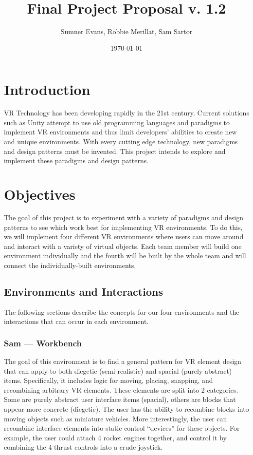 \documentclass[titlepage,12pt]{article}
\title{Final Project Proposal v. 1.2}
\author{Sumner Evans, Robbie Merillat, Sam Sartor}
\date{\today}
\begin{document}
\maketitle

\section{Introduction}

VR Technology has been developing rapidly in the 21st century. Current solutions
such as Unity attempt to use old programming languages and paradigms to
implement VR environments and thus limit developers' abilities to create new and
unique environments. With every cutting edge technology, new paradigms and
design patterns must be invented. This project intends to explore and implement
these paradigms and design patterns.

\section{Objectives}

The goal of this project is to experiment with a variety of paradigms and design
patterns to see which work best for implementing VR environments. To do this, we
will implement four different VR environments where users can move around and
interact with a variety of virtual objects. Each team member will build one
environment individually and the fourth will be built by the whole team and will
connect the individually-built environments.

\subsection{Environments and Interactions}
The following sections describe the concepts for our four environments and the
interactions that can occur in each environment.


\subsubsection{Sam --- Workbench}
The goal of this environment is to find a general pattern for VR element design
that can apply to both diegetic (semi-realistic) and spacial (purely abstract)
items. Specifically, it includes logic for moving, placing, snapping, and
recombining arbitrary VR elements. These elements are split into 2 categories.
Some are purely abstract user interface items (spacial), others are blocks that
appear more concrete (diegetic). The user has the ability to recombine blocks
into moving objects such as miniature vehicles. More interestingly, the user can
recombine interface elements into static control ``devices'' for these objects.
For example, the user could attach 4 rocket engines together, and control it by
combining the 4 thrust controls into a crude joystick.
\end{document}
